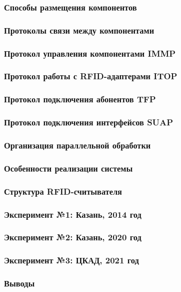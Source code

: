 \begin{frame}
    \frametitle{Способы размещения компонентов}
\end{frame}

\begin{frame}
    \frametitle{Протоколы связи между компонентами}
\end{frame}

\begin{frame}
    \frametitle{Протокол управления компонентами IMMP}
\end{frame}

\begin{frame}
    \frametitle{Протокол работы с RFID-адаптерами ITOP}
\end{frame}

\begin{frame}
    \frametitle{Протокол подключения абонентов TFP}
\end{frame}

\begin{frame}
    \frametitle{Протокол подключения интерфейсов SUAP}
\end{frame}

\begin{frame}
    \frametitle{Организация параллельной обработки}
\end{frame}

\begin{frame}
    \frametitle{Особенности реализации системы}
\end{frame}

\begin{frame}
    \frametitle{Структура RFID-считывателя}
\end{frame}

\begin{frame}
    \frametitle{Эксперимент №1: Казань, 2014 год}
\end{frame}

\begin{frame}
    \frametitle{Эксперимент №2: Казань, 2020 год}
\end{frame}

\begin{frame}
    \frametitle{Эксперимент №3: ЦКАД, 2021 год}
\end{frame}

\begin{frame}
    \frametitle{Выводы}
\end{frame}





